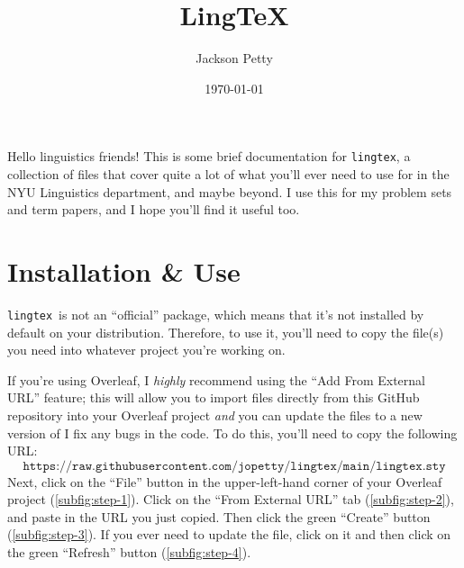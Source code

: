 \documentclass{article}
\title{Ling\TeX}
\author{Jackson Petty}
\date{\today}
\def\lingtex{\texttt{lingtex}}
\begin{document}
\maketitle

\noindent
Hello linguistics friends! This is some brief documentation for \texttt{lingtex}, a collection of  files that cover quite a lot of what you'll ever need to use  for in the NYU Linguistics department, and maybe beyond. I use this for my problem sets and term papers, and I hope you'll find it useful too.

\section{Installation \& Use} \label{sec:installation-use}

\lingtex\ is not an \enquote{official}  package, which means that it's not installed by default on your  distribution. Therefore, to use it, you'll need to copy the file(s) you need into whatever project you're working on.

If you're using Overleaf, I \emph{highly} recommend using the \enquote{Add From External URL} feature; this will allow you to import files directly from this GitHub repository into your Overleaf project \emph{and} you can update the files to a new version of I fix any bugs in the code. To do this, you'll need to copy the following URL:
$$
    \texttt{https://raw.githubusercontent.com/jopetty/lingtex/main/lingtex.sty}
$$
Next, click on the \enquote{File} button in the upper-left-hand corner of your Overleaf project (\ref{subfig:step-1}). Click on the \enquote{From External URL} tab (\ref{subfig:step-2}), and paste in the URL you just copied.  Then click the green \enquote{Create} button (\ref{subfig:step-3}). If you ever need to update the file, click on it and then click on the green \enquote{Refresh} button (\ref{subfig:step-4}).
\end{document}

